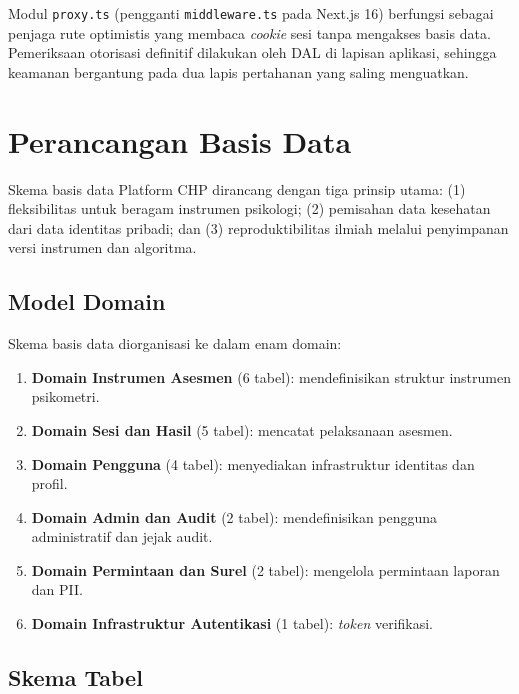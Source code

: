 Modul \texttt{proxy.ts} (pengganti \texttt{middleware.ts} pada Next.js 16) berfungsi sebagai penjaga rute optimistis yang membaca \textit{cookie} sesi tanpa mengakses basis data. Pemeriksaan otorisasi definitif dilakukan oleh DAL di lapisan aplikasi, sehingga keamanan bergantung pada dua lapis pertahanan yang saling menguatkan.

\section{Perancangan Basis Data}
\label{sec:perancangan-db}

Skema basis data Platform CHP dirancang dengan tiga prinsip utama: (1) fleksibilitas untuk beragam instrumen psikologi; (2) pemisahan data kesehatan dari data identitas pribadi; dan (3) reproduktibilitas ilmiah melalui penyimpanan versi instrumen dan algoritma.

\subsection{Model Domain}

Skema basis data diorganisasi ke dalam enam domain:

\begin{enumerate}[leftmargin=2cm]
  \item \textbf{Domain Instrumen Asesmen} (6 tabel): mendefinisikan struktur instrumen psikometri.
  \item \textbf{Domain Sesi dan Hasil} (5 tabel): mencatat pelaksanaan asesmen.
  \item \textbf{Domain Pengguna} (4 tabel): menyediakan infrastruktur identitas dan profil.
  \item \textbf{Domain Admin dan Audit} (2 tabel): mendefinisikan pengguna administratif dan jejak audit.
  \item \textbf{Domain Permintaan dan Surel} (2 tabel): mengelola permintaan laporan dan PII.
  \item \textbf{Domain Infrastruktur Autentikasi} (1 tabel): \textit{token} verifikasi.
\end{enumerate}

\subsection{Skema Tabel}

